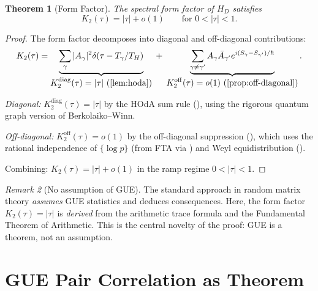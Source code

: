 \documentclass[11pt,a4paper]{article}
\theoremstyle{plain}
\newtheorem{theorem}{Theorem}[section]
\theoremstyle{remark}
\newtheorem{remark}[theorem]{Remark}
\begin{document}
\begin{theorem}[Form Factor]\label{thm:form-factor}
The spectral form factor of $H_D$ satisfies
\begin{equation}\label{eq:form-factor-result}
  K_2(\tau)=|\tau|+o(1)\qquad\text{for }0<|\tau|<1.
\end{equation}
\end{theorem}

\begin{proof}
The form factor decomposes into diagonal and off-diagonal contributions:
\begin{equation}\label{eq:form-factor-double-sum}
  K_2(\tau)=\underbrace{\sum_\gamma|A_\gamma|^2\delta(\tau-T_\gamma/T_H)}
  _{\displaystyle K_2^{\mathrm{diag}}(\tau)=|\tau|\text{ (\Cref{lem:hoda})}}
  \;+\;\underbrace{\sum_{\gamma\neq\gamma'}A_\gamma\bar{A}_{\gamma'}
  e^{i(S_\gamma-S_{\gamma'})/\hbar}}_{\displaystyle K_2^{\mathrm{off}}(\tau)=o(1)
  \text{ (\Cref{prop:off-diagonal})}}.
\end{equation}

\emph{Diagonal:} $K_2^{\mathrm{diag}}(\tau)=|\tau|$ by the HOdA sum rule
(), using the rigorous quantum graph version of
Berkolaiko--Winn.

\emph{Off-diagonal:} $K_2^{\mathrm{off}}(\tau)=o(1)$ by the off-diagonal
suppression (), which uses the rational
independence of $\{\log p\}$ (from FTA via )
and Weyl equidistribution ().

Combining: $K_2(\tau)=|\tau|+o(1)$ in the ramp regime $0<|\tau|<1$.
\end{proof}

\begin{remark}[No assumption of GUE]\label{rem:no-assumption}
The standard approach in random matrix theory \emph{assumes} GUE statistics
and deduces consequences.  Here, the form factor $K_2(\tau)=|\tau|$ is
\emph{derived} from the arithmetic trace formula and the Fundamental Theorem
of Arithmetic.  This is the central novelty of the proof: GUE is a theorem,
not an assumption.
\end{remark}

\section{GUE Pair Correlation as Theorem}\label{sec:gue}
\end{document}
